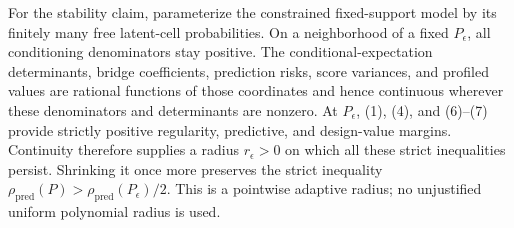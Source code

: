 For the stability claim, parameterize the constrained fixed-support model by its finitely many free latent-cell probabilities.  On a neighborhood of a fixed \(P_\epsilon\), all conditioning denominators stay positive.  The conditional-expectation determinants, bridge coefficients, prediction risks, score variances, and profiled values are rational functions of those coordinates and hence continuous wherever these denominators and determinants are nonzero.  At \(P_\epsilon\), (1), (4), and (6)--(7) provide strictly positive regularity, predictive, and design-value margins.  Continuity therefore supplies a radius \(r_\epsilon>0\) on which all these strict inequalities persist.  Shrinking it once more preserves the strict inequality \(\rho_{\mathrm{pred}}(P)>\rho_{\mathrm{pred}}(P_\epsilon)/2\).  This is a pointwise adaptive radius; no unjustified uniform polynomial radius is used.